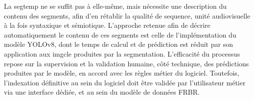 La \gls{segtemp} ne se suffit pas à elle-même, mais nécessite une description du contenu des segments, afin d'en rétablir la qualité de \gls{sequence}, unité audiovisuelle à la fois syntaxique et sémiotique. L'approche retenue afin de décrire automatiquement le contenu de ces segments est celle de l'implémentation du modèle YOLOv8, dont le temps de calcul et de prédiction est réduit par son application aux \gls{imgcle} produites par la segmentation. L'efficacité du processus repose sur la supervision et la validation humaine, côté technique, des prédictions produites par le modèle, en accord avec les règles métier du logiciel. Toutefois, l'indexation définitive au sein du logiciel doit être validée par l'utilisateur métier via une interface dédiée, et au sein du modèle de données FRBR. 









 










